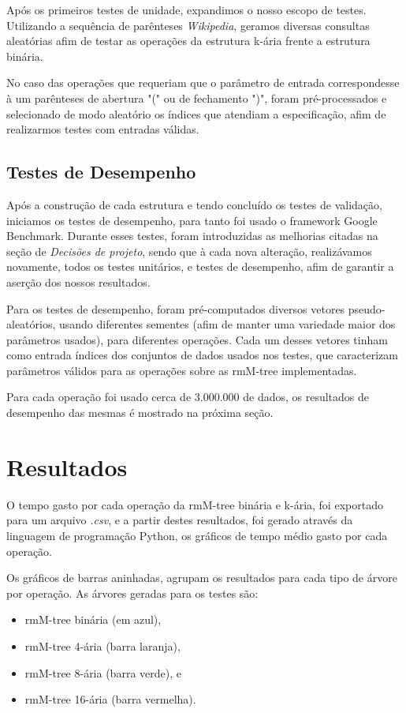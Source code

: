 Após os primeiros testes de unidade, expandimos o nosso escopo de testes. Utilizando a sequência de parênteses \textit{Wikipedia}, geramos diversas consultas aleatórias afim de testar as operações da estrutura k-ária frente a estrutura binária.

No caso das operações que requeriam que o parâmetro de entrada correspondesse à um parênteses de abertura "(" ou de fechamento ")", foram pré-processados e selecionado de modo aleatório os índices que atendiam a especificação, afim de realizarmos testes com entradas válidas.

\subsection{Testes de Desempenho}\label{sec:benchmark}
Após a construção de cada estrutura e tendo concluído os testes de validação, iniciamos os testes de desempenho, para tanto foi usado o framework Google Benchmark. Durante esses testes, foram introduzidas as melhorias citadas na seção de \textit{Decisões de projeto}, sendo que à cada nova alteração, realizávamos novamente, todos os testes unitários, e testes de desempenho, afim de garantir a aserção dos nossos resultados.

Para os testes de desempenho, foram pré-computados diversos vetores pseudo-aleatórios, usando diferentes sementes (afim de manter uma variedade maior dos parâmetros usados), para diferentes operações. Cada um desses vetores tinham como entrada  índices dos conjuntos de dados usados nos testes, que caracterizam parâmetros válidos para as operações sobre as rmM-tree implementadas. 

Para cada operação foi usado cerca de $3.000.000$ de dados, os resultados de desempenho das mesmas é mostrado na próxima seção.

\section{Resultados}\label{sec:resultados}
O tempo gasto por cada operação da rmM-tree binária e k-ária, foi exportado para um arquivo \textit{.csv}, e a partir destes resultados, foi gerado através da linguagem de programação Python, os gráficos de tempo médio gasto por cada operação. 

Os gráficos de barras aninhadas, agrupam os resultados para cada tipo de árvore por operação. As árvores geradas para os testes são:
\begin{itemize}
  \item rmM-tree binária (em azul),
  \item rmM-tree 4-ária (barra laranja), 
  \item rmM-tree 8-ária (barra verde), e
  \item rmM-tree 16-ária (barra vermelha).
\end{itemize}

